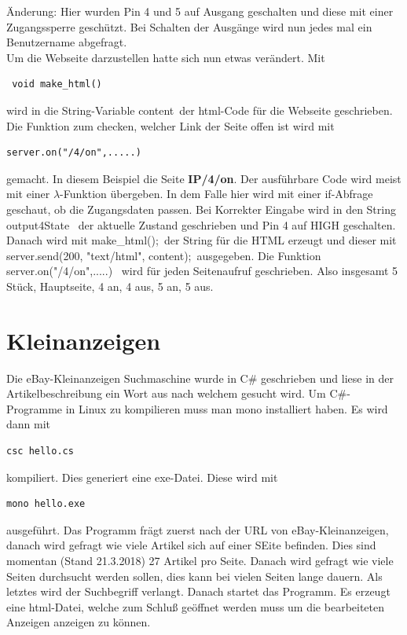 \documentclass[11pt,fleqn]{book} %
\numberwithin{equation}{section} %
\numberwithin{figure}{section} %
\numberwithin{table}{section} %
\begin{document}
Änderung: Hier wurden Pin 4 und 5 auf Ausgang geschalten und diese mit einer Zugangssperre geschützt. Bei Schalten der Ausgänge wird nun jedes mal ein Benutzername abgefragt.\\
Um die Webseite darzustellen hatte sich nun etwas verändert. Mit
\begin{lstlisting}
 void make_html()
\end{lstlisting}
wird in die String-Variable \grqq content\grqq \ der html-Code für die Webseite geschrieben. Die Funktion zum checken, welcher Link der Seite offen ist wird mit
\begin{lstlisting}
server.on("/4/on",.....)
\end{lstlisting}
gemacht. In diesem Beispiel die Seite \textbf{IP/4/on}. Der ausführbare Code wird meist mit einer $\lambda$-Funktion übergeben. In dem Falle hier wird mit einer if-Abfrage geschaut, ob die Zugangsdaten passen. Bei Korrekter Eingabe wird in den String \grqq output4State \grqq \ der aktuelle Zustand geschrieben und Pin 4 auf HIGH geschalten. Danach wird mit \grqq make\_html();\grqq \ der String für die HTML erzeugt und dieser mit \grqq server.send(200, "text/html", content);\grqq \ ausgegeben. Die Funktion \grqq server.on("/4/on",.....) \grqq \ wird für jeden Seitenaufruf geschrieben. Also insgesamt 5 Stück, Hauptseite, 4 an, 4 aus, 5 an, 5 aus.
\section{Kleinanzeigen}
Die eBay-Kleinanzeigen Suchmaschine wurde in C\# geschrieben und liese in der Artikelbeschreibung ein Wort aus nach welchem gesucht wird. Um C\#-Programme in Linux zu kompilieren muss man mono installiert haben. Es wird dann mit
\begin{lstlisting}
csc hello.cs
\end{lstlisting}
kompiliert. Dies generiert eine exe-Datei. Diese wird mit
\begin{lstlisting}
mono hello.exe
\end{lstlisting}
ausgeführt. Das Programm frägt zuerst nach der URL von eBay-Kleinanzeigen, danach wird gefragt wie viele Artikel sich auf einer SEite befinden. Dies sind momentan (Stand 21.3.2018) 27 Artikel pro Seite. Danach wird gefragt wie viele Seiten durchsucht werden sollen, dies kann bei vielen Seiten lange dauern. Als letztes wird der Suchbegriff verlangt. Danach startet das Programm. Es erzeugt eine html-Datei, welche zum Schluß geöffnet werden muss um die bearbeiteten Anzeigen anzeigen zu können.
\end{document}
